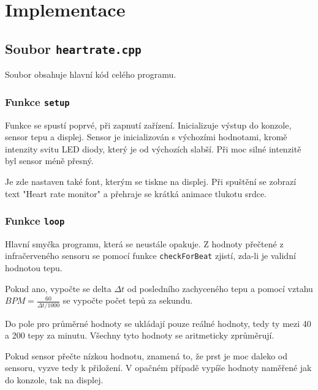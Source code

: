 \documentclass[11pt,a4paper]{article}
\begin{document}
        \section{Implementace}

            \subsection{Soubor \texttt{heartrate.cpp}}

            Soubor obsahuje hlavní kód celého programu.
   
                \subsubsection{Funkce \texttt{setup}}

                Funkce se spustí poprvé, při zapnutí zařízení. Inicializuje výstup do konzole, sensor tepu a displej. Sensor je 
                inicializován s výchozími hodnotami, kromě intenzity svitu LED diody, který je od výchozích slabší. Při moc
                silné intenzitě byl sensor méně přesný.

                Je zde nastaven také font, kterým se tiskne na displej. Při spuštění se zobrazí text "Heart rate monitor" a 
                přehraje se krátká animace tlukotu srdce.
    
                \subsubsection{Funkce \texttt{loop}}

                Hlavní smyčka programu, která se neustále opakuje. Z hodnoty přečtené z infračerveného sensoru se pomocí funkce
                \verb|checkForBeat| zjistí, zda-li je validní hodnotou tepu.

                Pokud ano, vypočte se delta $\Delta t$ od posledního zachyceného tepu a pomocí vztahu $BPM = \frac{60}{\Delta t / 1000}$ se vypočte počet tepů za sekundu.
                
                Do pole pro průměrné hodnoty se ukládají pouze reálné hodnoty, tedy ty mezi 40 a 200 tepy
                za minutu. Všechny tyto hodnoty se aritmeticky zprůměrují.

                Pokud sensor přečte nízkou hodnotu, znamená to, že prst je moc daleko od sensoru, vyzve tedy k přiložení. V
                opačném případě vypíše hodnoty naměřené jak do konzole, tak na displej. 
    
\end{document}
